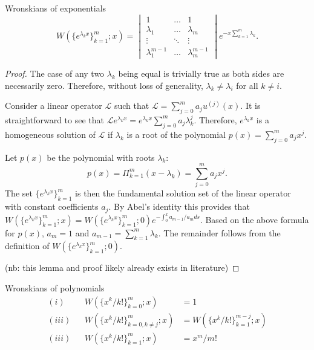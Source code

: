 \documentclass{book}
\begin{document}
\begin{lemma}{Wronskians of exponentials}
\begin{equation*}
W(\{e^{\lambda_k x} \}_{k=1}^m; x) = \begin{vmatrix} 1 & \dots & 1 \\
\lambda_1 & \dots & \lambda_m \\
\vdots & \ddots & \vdots \\
\lambda_1^{m-1} & \dots & \lambda_m^{m-1} \end{vmatrix}
e^{-x \sum_{k=1}^m \lambda_k} .
\end{equation*}
\label{lem:exp}
\end{lemma}

\begin{proof}
The case of any two $\lambda_k$ being equal is trivially true as both sides are necessarily zero.
Therefore, without loss of generality, $\lambda_k \neq \lambda_i$ for all $k \neq i$.

Consider a linear operator $\mathcal{L}$ such that $\mathcal{L} = \sum_{j=0}^m a_j u^{(j)}(x)$.
It is straightforward to see that $\mathcal{L} e^{\lambda_k x} = e^{\lambda_k x} \sum_{j=0}^m a_j \lambda_k^j$.
Therefore, $e^{\lambda_k x}$ is a homogeneous solution of $\mathcal{L}$ if $\lambda_k$ is a root of the polynomial $p(x) = \sum_{j=0}^m a_j x^j$.

Let $p(x)$ be the polynomial with roots $\lambda_k$:
\begin{equation*}
p(x) = \Pi_{k=1}^m \left (x - \lambda_k \right) = \sum_{j=0}^m a_j x^j.
\end{equation*}
The set $\{ e^{\lambda_k x} \}_{k=1}^m$ is then the fundamental solution set of the linear operator with constant coefficients $a_j$.
By Abel's identity this provides that $W(\{e^{\lambda_k x} \}_{k=1}^m ; x) = W(\{e^{\lambda_k x} \}_{k=1}^m ; 0) e^{ - \int_0^x a_{m-1} / a_m ds } $.
Based on the above formula for $p(x)$, $a_m = 1$ and $a_{m-1} = \sum_{k=1}^m \lambda_k$.
The remainder follows from the definition of $W(\{e^{\lambda_k x} \}_{k=1}^m ; 0)$.

(nb: this lemma and proof likely already exists in literature)
\end{proof}

\begin{lemma}{Wronskians of polynomials}
\begin{align*}
(i) && W(\{ x^k/k! \}_{k=0}^m; x) & = 1 \\
(iii) && W(\{ x^k/k! \}_{k=0, k \neq j}^m ; x) & = W(\{ x^k/k! \}_{k=1}^{m-j} ; x) \\
(iii) && W(\{ x^k/k! \}_{k=1}^m ; x) & = x^m/m!
\end{align*}
\label{lem:poly}
\end{lemma}
\end{document}
